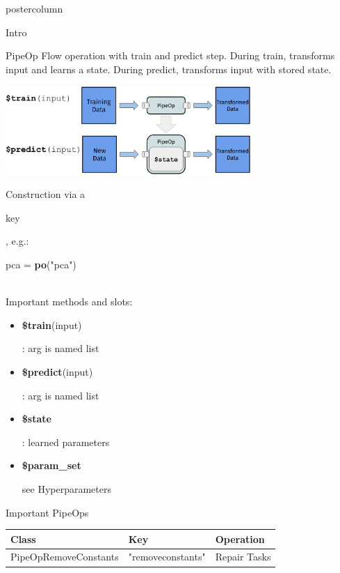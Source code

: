 \documentclass{beamer}
\newcommand{\codeinline}[1]{\begin{codeboxinline}#1\end{codeboxinline}}
\begin{document}
\begin{frame}[fragile]{}
\begin{columns}
\begin{column}{.245\textwidth}
\begin{beamercolorbox}[center]{postercolumn}
\begin{minipage}{.98\textwidth}
{\begin{myblock}{Intro}
            \end{myblock}
              \vspace{-1.0em}
              \begin{myblock}{PipeOp}
              \vspace{-1.0em}
              Flow operation with train and predict step. During train, transforms input and learns a state. During predict, transforms input with stored state.
              \begin{center}
                \includegraphics[width=0.7\textwidth]{img/po.pdf}
              \end{center}
              Construction via a \codeinline{key}, e.g.: \codeinline{pca = \textbf{po}("pca")} \\
              Important methods and slots:
              \begin{itemize}
                \item \codeinline{\textbf{\$train}(input)}: arg is named list
                \item \codeinline{\textbf{\$predict}(input)}: arg is named list
                \item \codeinline{\textbf{\$state}}: learned parameters
                \item \codeinline{\textbf{\$param\_set}} see Hyperparameters
              \end{itemize}
  			    \end{myblock}
              \vspace{-1.0em}
            \begin{myblock}{Important PipeOps}
              \vspace{-1.0em}
              \begin{footnotesize}
                \begin{centering}
                  \begin{tabular}{l l l}
                    \textbf{Class} & \textbf{Key} & \textbf{Operation} \\ \hline
                    PipeOpRemoveConstants & "removeconstants" & Repair Tasks\\

\end{tabular}
\end{centering}
\end{footnotesize}
\end{myblock}}
\end{minipage}
\end{beamercolorbox}
\end{column}
\end{columns}
\end{frame}
\end{document}
